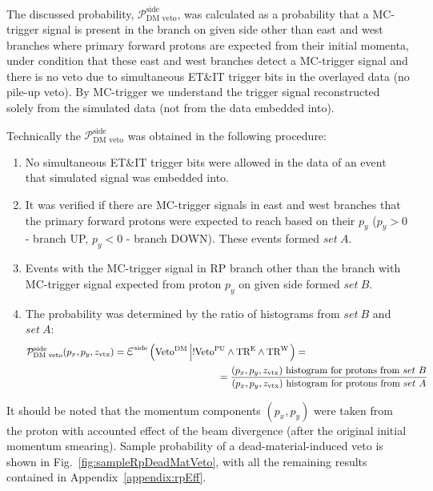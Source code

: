 The discussed probability, $\mathcal{P}_{\text{DM~veto}}^{\text{side}}$, was calculated as a probability that a MC-trigger signal is present in the branch on given side other than east and west branches where primary forward protons are expected from their initial momenta, under condition that these east and west branches detect a MC-trigger signal and there is no veto due to simultaneous ET\&IT trigger bits in the overlayed data (no pile-up veto). By MC-trigger we understand the trigger signal reconstructed solely from the simulated data (not from the data embedded into).

Technically the $\mathcal{P}_{\text{DM~veto}}^{\text{side}}$ was obtained in the following procedure:
\begin{enumerate}
  \item No simultaneous ET\&IT trigger bits were allowed in the data of an event that simulated signal was embedded into.
	\item It was verified if there are MC-trigger signals in east and west branches that the primary forward protons were expected to reach based on their $p_{y}$ ($p_{y}>0$ - branch UP, $p_{y}<0$ - branch DOWN). These events formed $set~A$.
	\item Events with the MC-trigger signal in RP branch other than the branch with MC-trigger signal expected from proton $p_{y}$ on given side formed $set~B$.
	\item The probability was determined by the ratio of histograms from $set~B$ and $set~A$:
	\begin{equation}\label{eq:rpDeadMatProb}
	\begin{split}
 \mathcal{P}_{\text{DM~veto}}^{\text{side}}(p_{x}, p_{y}, z_{\text{vtx}}) = \mbox{\LARGE$\varepsilon$}^{\text{side}}\left(\Vdm\left|!\Vpu\land\TRE\land\TRW\right.\right) = ~~~~~~~~~~~~~~~~~~~~~~~~~~~~~~~~~~~~~~\\~~~~~~~~~~~~~~~~~~~~~~~~~~~~~~~ =%
 \frac{(p_{x}, p_{y}, z_{\text{vtx}})~\text{histogram for protons from}~set~B}{(p_{x}, p_{y}, z_{\text{vtx}})~\text{histogram for protons from}~set~A}
 \end{split}
  \end{equation}
	
\end{enumerate}



It should be noted that the momentum components $(p_{x}, p_{y})$ were taken from the proton with accounted effect of the beam divergence (after the original initial momentum smearing). Sample probability of a dead-material-induced veto is shown in Fig.~\ref{fig:sampleRpDeadMatVeto}, with all the remaining results contained in Appendix~\ref{appendix:rpEff}.

